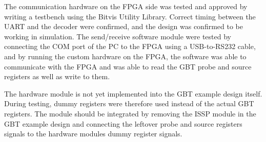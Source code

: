 \documentclass[main.tex]{subfiles}
\begin{document}
The communication hardware on the FPGA side was tested and approved by writing a testbench using the Bitvis Utility Library. Correct timing between the UART and the decoder were confirmed, and the design was confirmed to be working in simulation. The send/receive software module were tested by connecting the COM port of the PC to the FPGA using a USB-to-RS232 cable, and by running the custom hardware on the FPGA, the software was able to communicate with the FPGA and was able to read the GBT probe and source registers as well as write to them. 

The hardware module is not yet implemented into the GBT example design itself. During testing, dummy registers were therefore used instead of the actual GBT registers. The module should be integrated by removing the ISSP module in the GBT example design and connecting the leftover probe and source registers signals to the hardware modules dummy register signals.
\end{document}

